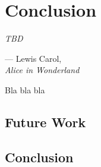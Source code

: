 \let\textcircled=\pgftextcircled
\chapter*{Conclusion}
\label{chap:discussion}

\epigraph{\hspace{4ex}\textit{TBD}}{--- Lewis Carol,\\ \textit{Alice in Wonderland}}

Bla bla bla

\section*{Future Work}

\section*{Conclusion}
